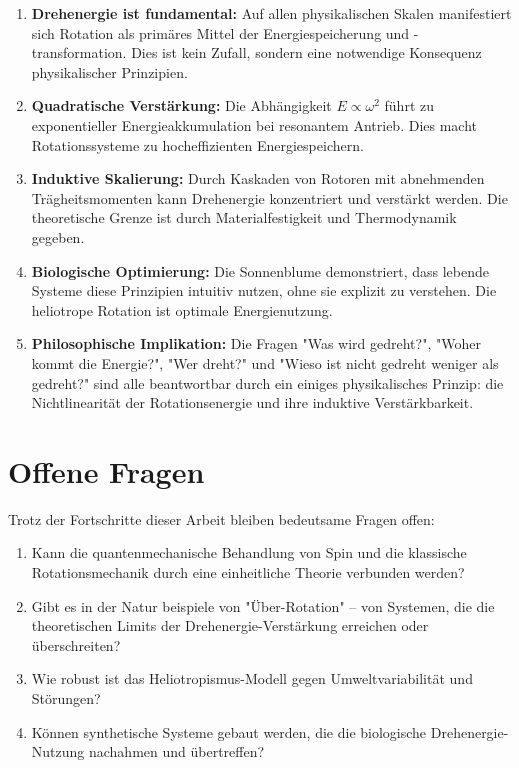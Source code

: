 \documentclass[12pt,a4paper]{report}
\theoremstyle{plain}
\theoremstyle{definition}
\theoremstyle{remark}
\begin{document}
\begin{enumerate}
	\item \textbf{Drehenergie ist fundamental:} Auf allen physikalischen Skalen manifestiert sich Rotation als primäres Mittel der Energiespeicherung und -transformation. Dies ist kein Zufall, sondern eine notwendige Konsequenz physikalischer Prinzipien.
	
	\item \textbf{Quadratische Verstärkung:} Die Abhängigkeit $E \propto \omega^2$ führt zu exponentieller Energieakkumulation bei resonantem Antrieb. Dies macht Rotationssysteme zu hocheffizienten Energiespeichern.
	
	\item \textbf{Induktive Skalierung:} Durch Kaskaden von Rotoren mit abnehmenden Trägheitsmomenten kann Drehenergie konzentriert und verstärkt werden. Die theoretische Grenze ist durch Materialfestigkeit und Thermodynamik gegeben.
	
	\item \textbf{Biologische Optimierung:} Die Sonnenblume demonstriert, dass lebende Systeme diese Prinzipien intuitiv nutzen, ohne sie explizit zu verstehen. Die heliotrope Rotation ist optimale Energienutzung.
	
	\item \textbf{Philosophische Implikation:} Die Fragen "Was wird gedreht?", "Woher kommt die Energie?", "Wer dreht?" und "Wieso ist nicht gedreht weniger als gedreht?" sind alle beantwortbar durch ein einiges physikalisches Prinzip: die Nichtlinearität der Rotationsenergie und ihre induktive Verstärkbarkeit.
\end{enumerate}

\section{Offene Fragen}

Trotz der Fortschritte dieser Arbeit bleiben bedeutsame Fragen offen:

\begin{enumerate}
	\item Kann die quantenmechanische Behandlung von Spin und die klassische Rotationsmechanik durch eine einheitliche Theorie verbunden werden?
	
	\item Gibt es in der Natur beispiele von "Über-Rotation" -- von Systemen, die die theoretischen Limits der Drehenergie-Verstärkung erreichen oder überschreiten?
	
	\item Wie robust ist das Heliotropismus-Modell gegen Umweltvariabilität und Störungen?
	
	\item Können synthetische Systeme gebaut werden, die die biologische Drehenergie-Nutzung nachahmen und übertreffen?
\end{enumerate}
\end{document}
